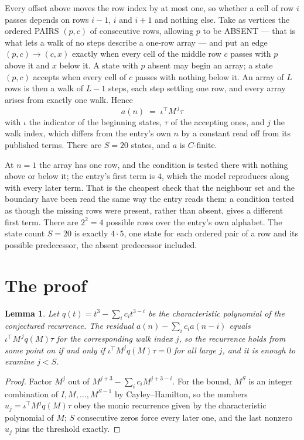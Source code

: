 \documentclass[11pt,a4paper]{article}
\theoremstyle{plain}
\newtheorem{lemma}[theorem]{Lemma}
\theoremstyle{definition}
\begin{document}
Every offset above moves the row index by at most one, so whether a cell of row $i$ passes
depends on rows $i-1$, $i$ and $i+1$ and nothing else. Take as vertices the ordered PAIRS
$(p,c)$ of consecutive rows, allowing $p$ to be ABSENT --- that is what lets a walk of no steps
describe a one-row array --- and put an edge $(p,c)\to(c,x)$ exactly when every cell of the
middle row $c$ passes with $p$ above it and $x$ below it. A state with $p$ absent may begin an
array; a state $(p,c)$ accepts when every cell of $c$ passes with nothing below it. An array of
$L$ rows is then a walk of $L-1$ steps, each step settling one row, and every array arises from
exactly one walk. Hence
\[
a(n)\;=\;\iota^{\!\top}M^{\,j}\tau
\]
with $\iota$ the indicator of the beginning states, $\tau$ of the accepting ones, and $j$ the
walk index, which differs from the entry's own $n$ by a constant read off from its published
terms. There are $S=20$ states, and $a$ is $C$-finite.

At $n=1$ the array has one row, and
the condition is tested there with nothing above or below it; the entry's first term is
$4$, which the model reproduces along with every later term. That is the cheapest check
that the neighbour set and the boundary have been read the same way the entry reads them: a
condition tested as though the missing rows were present, rather than absent, gives a different
first term. There are $2^{2}=4$ possible rows over the entry's own alphabet. The state count $S=20$ is exactly $4\cdot5$,
one state for each ordered pair of a row and its possible predecessor, the absent predecessor
included.

\section{The proof}

\begin{lemma}\label{lem:crit}
Let $q(t)=t^{3}-\sum_i c_it^{3-i}$ be the characteristic polynomial of the
conjectured recurrence. The residual $a(n)-\sum_ic_ia(n-i)$ equals
$\iota^{\!\top}M^{\,j}q(M)\tau$ for the corresponding walk index $j$, so the recurrence
holds from some point on if and only if $\iota^{\!\top}M^{j}q(M)\tau=0$ for all large $j$,
and it is enough to examine $j<S$.
\end{lemma}

\begin{proof}
Factor $M^{j}$ out of $M^{j+3}-\sum_ic_iM^{j+3-i}$. For the bound, $M^{S}$
is an integer combination of $I,M,\dots,M^{S-1}$ by Cayley--Hamilton, so the numbers
$u_j=\iota^{\!\top}M^{j}q(M)\tau$ obey the monic recurrence given by the characteristic
polynomial of $M$; $S$ consecutive zeros force every later one, and the last nonzero $u_j$
pins the threshold exactly.
\end{proof}
\end{document}
